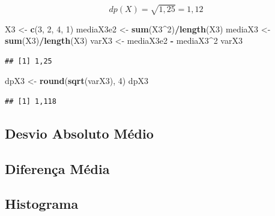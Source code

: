 \documentclass[
]{book}
\newenvironment{Shaded}{\begin{snugshade}}{\end{snugshade}}
\newcommand{\DecValTok}[1]{\textcolor[rgb]{0.00,0.00,0.81}{#1}}
\newcommand{\KeywordTok}[1]{\textcolor[rgb]{0.13,0.29,0.53}{\textbf{#1}}}
\newcommand{\NormalTok}[1]{#1}
\newcommand{\OperatorTok}[1]{\textcolor[rgb]{0.81,0.36,0.00}{\textbf{#1}}}
\newcommand{\StringTok}[1]{\textcolor[rgb]{0.31,0.60,0.02}{#1}}
\begin{document}
\begin{equation*}
  dp(X) = \sqrt{1,25} = 1,12
\end{equation*}

\begin{Shaded}
\begin{Highlighting}[]
\NormalTok{X3 <-}\StringTok{ }\KeywordTok{c}\NormalTok{(}\DecValTok{3}\NormalTok{, }\DecValTok{2}\NormalTok{, }\DecValTok{4}\NormalTok{, }\DecValTok{1}\NormalTok{)}
\NormalTok{mediaX3e2 <-}\StringTok{ }\KeywordTok{sum}\NormalTok{(X3}\OperatorTok{^}\DecValTok{2}\NormalTok{)}\OperatorTok{/}\KeywordTok{length}\NormalTok{(X3)}
\NormalTok{mediaX3 <-}\StringTok{ }\KeywordTok{sum}\NormalTok{(X3)}\OperatorTok{/}\KeywordTok{length}\NormalTok{(X3)}
\NormalTok{varX3 <-}\StringTok{ }\NormalTok{mediaX3e2 }\OperatorTok{-}\StringTok{ }\NormalTok{mediaX3}\OperatorTok{^}\DecValTok{2}
\NormalTok{varX3}
\end{Highlighting}
\end{Shaded}

\begin{verbatim}
## [1] 1,25
\end{verbatim}

\begin{Shaded}
\begin{Highlighting}[]
\NormalTok{dpX3 <-}\StringTok{ }\KeywordTok{round}\NormalTok{(}\KeywordTok{sqrt}\NormalTok{(varX3), }\DecValTok{4}\NormalTok{)}
\NormalTok{dpX3}
\end{Highlighting}
\end{Shaded}

\begin{verbatim}
## [1] 1,118
\end{verbatim}

\hypertarget{desvio-absoluto-muxe9dio}{%
\subsection{Desvio Absoluto Médio}\label{desvio-absoluto-muxe9dio}}

\hypertarget{diferenuxe7a-muxe9dia}{%
\subsection{Diferença Média}\label{diferenuxe7a-muxe9dia}}

\hypertarget{histograma}{%
\subsection{Histograma}\label{histograma}}
\end{document}
